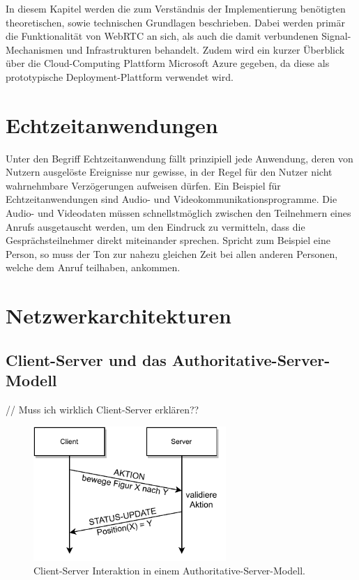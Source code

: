 In diesem Kapitel werden die zum Verständnis der Implementierung benötigten theoretischen, sowie technischen Grundlagen beschrieben. Dabei werden primär die Funktionalität von \acs{WebRTC} an sich, als auch die damit verbundenen Signal-Mechanismen und Infrastrukturen behandelt. Zudem wird ein kurzer Überblick über die Cloud-Computing Plattform Microsoft Azure gegeben, da diese als prototypische Deployment-Plattform verwendet wird.

\section{Echtzeitanwendungen}
Unter den Begriff Echtzeitanwendung fällt prinzipiell jede Anwendung, deren von Nutzern ausgelöste Ereignisse nur gewisse, in der Regel für den Nutzer nicht wahrnehmbare Verzögerungen aufweisen dürfen. Ein Beispiel für Echtzeitanwendungen sind Audio- und Videokommunikationsprogramme. Die Audio- und Videodaten müssen schnellstmöglich zwischen den Teilnehmern eines Anrufs ausgetauscht werden, um den Eindruck zu vermitteln, dass die Gesprächsteilnehmer direkt miteinander sprechen. Spricht zum Beispiel eine Person, so muss der Ton zur nahezu gleichen Zeit bei allen anderen Personen, welche dem Anruf teilhaben, ankommen.

\section{Netzwerkarchitekturen}

\subsection{Client-Server und das Authoritative-Server-Modell}
// Muss ich wirklich Client-Server erklären??
\begin{figure}[h]
\centering
\includegraphics[width=0.65\textwidth]{bilder/PDF_SVG/AUTH_SERVER.pdf}
\caption{Client-Server Interaktion in einem Authoritative-Server-Modell.}
\end{figure}

